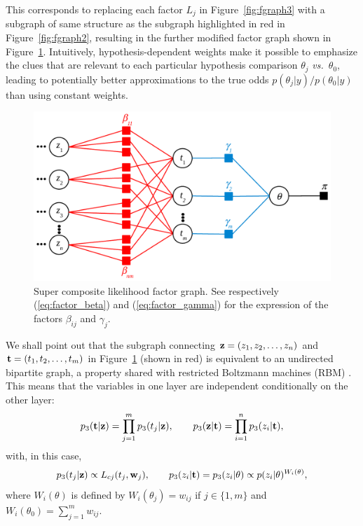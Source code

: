 \documentclass[english]{scrartcl}
\begin{document}

This corresponds to replacing each factor $L_j$ in Figure~\ref{fig:fgraph3} with a subgraph of same structure as the subgraph highlighted in red in Figure~\ref{fig:fgraph2}, resulting in the further modified factor graph shown in Figure~\ref{fig:fgraph4}. Intuitively, hypothesis-dependent weights make it possible to emphasize the clues that are relevant to each particular hypothesis comparison $\theta_j$ {\em vs.}~$\theta_0$, leading to potentially better approximations to the true odds $p(\theta_j|y)/p(\theta_0|y)$ than using constant weights.

\begin{figure}[!ht]
  \begin{center}
    \includegraphics[width=.7\textwidth]{fgraph4.pdf}
  \end{center}
\caption{Super composite likelihood factor graph. See respectively (\ref{eq:factor_beta}) and (\ref{eq:factor_gamma}) for the expression of the factors $\beta_{ij}$ and  $\gamma_j$.}
\label{fig:fgraph4}
\end{figure}

We shall point out that the subgraph connecting ${\bf z}=(z_1,z_2,\ldots,z_n)$ and ${\bf t}=(t_1,t_2,\ldots,t_m)$ in Figure~\ref{fig:fgraph4} (shown in red) is equivalent to an undirected bipartite graph, a property shared with restricted Boltzmann machines (RBM) \cite{Fischer-14,Hinton-06,Larochelle-08}. This means that the variables in one layer are independent conditionally on the other layer:
\begin{equation}
\label{eq:bipartite}
p_3({\bf t}|{\bf z}) = \prod_{j=1}^m p_3(t_j|{\bf z}),
\qquad
p_3({\bf z}|{\bf t}) = \prod_{i=1}^n p_3(z_i|{\bf t}),
\end{equation}
with, in this case, 
$$
p_3(t_j|{\bf z}) \propto L_{cj}(t_j, \mathbf{w}_j),
\qquad
p_3(z_i|{\bf t}) = p_3(z_i|\theta) \propto p(z_i|\theta)^{W_i(\theta)},
$$
where $W_i(\theta)$ is defined by $W_i(\theta_j)=w_{ij}$ if $j\in\{1,m\}$ and $W_i(\theta_0)=\sum_{j=1}^m w_{ij}$.
\end{document}

